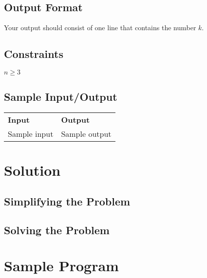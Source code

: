 \documentclass[12pt]{report}
\begin{document}
	\subsection*{Output Format}
	Your output should consist of one line that contains the number $k$.

	\subsection*{Constraints}
	$n\geq3$

	\subsection*{Sample Input/Output}
	\begin{tabular}{ |l|l| } 
		\hline
		\textbf{Input} & \textbf{Output} \\
		{Sample input} & {Sample output} \\ %
		\hline
	\end{tabular}


	\section*{Solution}


	\subsection*{Simplifying the Problem}

	\subsection*{Solving the Problem}


	\section*{Sample Program}
	
	
\end{document}
